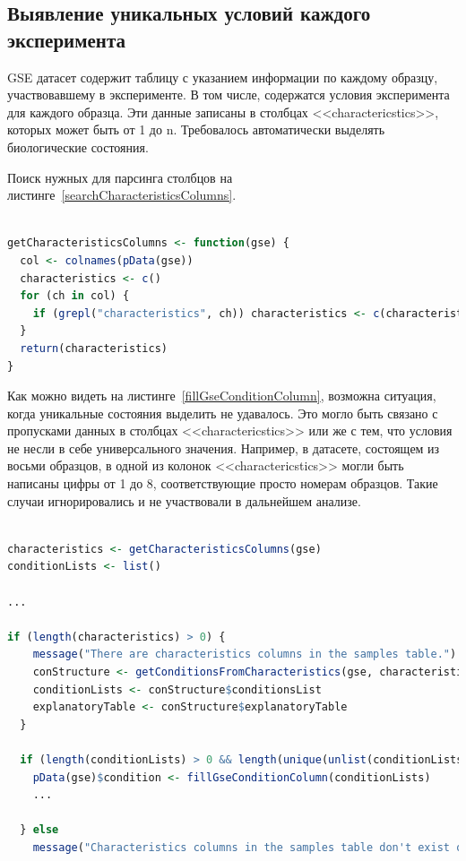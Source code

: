 \documentclass[times,specification,annotation]{itmo-student-thesis}
\begin{document}
\subsection{Выявление уникальных условий каждого эксперимента}

GSE датасет содержит таблицу с указанием информации по каждому образцу, участвовавшему в эксперименте. В том числе, содержатся условия эксперимента для каждого образца. Эти данные записаны в столбцах <<charactericstics>>, которых может быть от 1 до n. Требовалось автоматически выделять биологические состояния.  

Поиск нужных для парсинга столбцов на листинге~\ref{searchCharacteristicsColumns}. 

\begin{lstlisting}[float=!h, caption={Поиск столбцов <<charactericstics>>.}, captionpos=b, label={searchCharacteristicsColumns}, basicstyle=\footnotesize, language=R]

getCharacteristicsColumns <- function(gse) {
  col <- colnames(pData(gse))
  characteristics <- c()
  for (ch in col) {
    if (grepl("characteristics", ch)) characteristics <- c(characteristics, ch)
  }
  return(characteristics)
}

\end{lstlisting}

Как можно видеть на листинге~\ref{fillGseConditionColumn}, возможна ситуация, когда уникальные состояния выделить не удавалось. Это могло быть связано с пропусками данных в столбцах <<charactericstics>> или же с тем, что условия не несли в себе универсального значения. Например, в датасете, состоящем из восьми образцов, в одной из колонок <<charactericstics>> могли быть написаны цифры от 1 до 8, соответствующие просто номерам образцов. Такие случаи игнорировались и не участвовали в дальнейшем анализе.  

\begin{lstlisting}[float=!h, caption={Выделение условий.}, captionpos=b, label={fillGseConditionColumn}, basicstyle=\footnotesize, language=R]

characteristics <- getCharacteristicsColumns(gse)
conditionLists <- list()

...

if (length(characteristics) > 0) {
    message("There are characteristics columns in the samples table.")
    conStructure <- getConditionsFromCharacteristics(gse, characteristics)
    conditionLists <- conStructure$conditionsList
    explanatoryTable <- conStructure$explanatoryTable 
  }
  
  if (length(conditionLists) > 0 && length(unique(unlist(conditionLists))) > 1) {
    pData(gse)$condition <- fillGseConditionColumn(conditionLists) 
    ...

  } else 
    message("Characteristics columns in the samples table don't exist or were unhelpful.")

\end{lstlisting}
\end{document}
